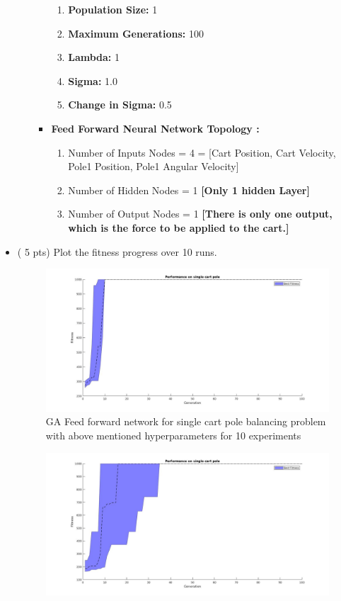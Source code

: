\documentclass{article}
\begin{document}
\begin{itemize}
\begin{enumerate}
\begin{itemize}
	\begin{enumerate}
	\item \textbf{Population Size:} 1
	\item \textbf{Maximum Generations:} 100
	\item \textbf{Lambda:} 1
	\item \textbf{Sigma:} 1.0
	\item \textbf{Change in Sigma:} 0.5
	\end{enumerate}
	\item \textbf{Feed Forward Neural Network Topology :}
	\begin{enumerate}
	\item Number of Inputs Nodes = 4 = [Cart Position, Cart Velocity, Pole1 Position, Pole1 Angular Velocity]
	\item Number of Hidden Nodes = 1 \textbf{[Only 1 hidden Layer]}
	\item Number of Output Nodes = 1 \textbf{[There is only one output, which is the force to be applied to the cart.]}
	\end{enumerate}
	\end{itemize}
\end{enumerate}
\color{black}
	\item ( 5 pts) Plot the fitness progress over 10 runs.
        \begin{figure}[htpb]
            \centering
            \includegraphics[width=1.0\linewidth]{ga_10exp.jpg}
            \caption{GA Feed forward network for single cart pole balancing problem with above mentioned hyperparameters for 10 experiments}
            \label{fig:}
        \end{figure}
        \begin{figure}[htpb]
            \centering
            \includegraphics[width=1.0\linewidth]{es_10exp.jpg}

\end{figure}
\end{itemize}
\end{document}
